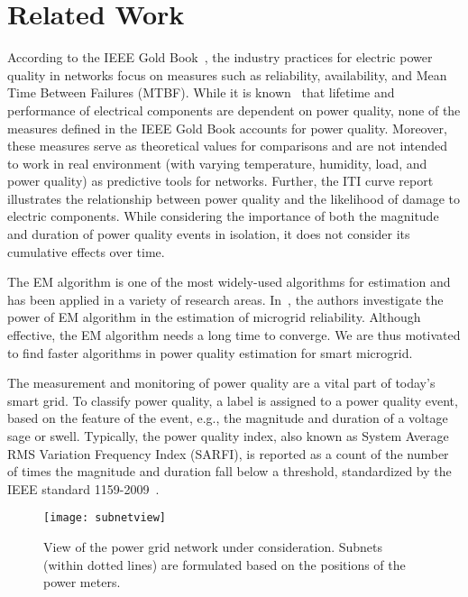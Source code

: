 \section{Related Work}
According to the IEEE Gold Book~\cite{goldbook}, the industry practices for electric power quality in networks focus on measures such as reliability, availability, and Mean Time Between Failures (MTBF). While it is known~\cite{iti_curve} that lifetime and performance of electrical components are dependent on power quality, none of the measures defined in the IEEE Gold Book accounts for power quality. Moreover, these measures serve as theoretical values for comparisons and are not intended to work in real environment (with varying temperature, humidity, load, and power quality) as predictive tools for networks. Further, the ITI curve report illustrates the relationship between power quality and the likelihood of damage to electric components. While considering the importance of both the magnitude and duration of power quality events in isolation, it does not consider its cumulative effects over time.

The EM algorithm is one of the most widely-used algorithms for estimation and has been applied in a variety of research areas.
 In~\cite{catherine_pri}, the authors investigate the power of EM algorithm in the estimation of microgrid reliability. Although effective, the EM algorithm needs a long time to converge. We are thus motivated to find faster algorithms in power quality estimation for smart microgrid.

The measurement and monitoring of power quality are a vital part of today's smart grid. To classify power quality, a label is assigned to a power quality event, based on the feature of the event, e.g., the magnitude and duration of a voltage sage or swell. Typically, the power quality index, also known as System Average RMS Variation Frequency Index (SARFI), is reported as a count of the number of times the magnitude and duration fall below a threshold, standardized by the IEEE standard 1159-2009~\cite{IEEE09_1159}.

\begin{figure}[!t]
    \centering
    \vspace{-15pt}
    \texttt{[image: subnetview]}
    \caption{View of the power grid network under consideration. Subnets (within dotted lines) are formulated based on the positions of the power meters.}
    \label{fig:subnetview}
\end{figure}


